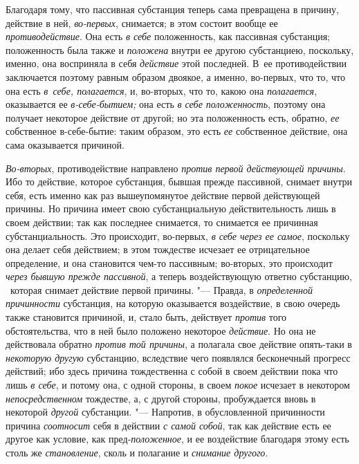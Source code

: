 Благодаря тому, что пассивная субстанция теперь сама превращена в причину,
действие в ней, {\em во-первых}, снимается; в этом
состоит вообще ее {\em противодействие}. Она есть
{\em в себе} положенность, как пассивная субстанция;
положенность была также и {\em положена} внутри ее
другою субстанциею, поскольку, именно, она восприняла в себя
{\em действие} этой последней. В~ее противодействии
заключается поэтому равным образом двоякое, а именно, во-первых, что то,
что она есть {\em в~себе, полагается}, и, во-вторых, что то, какою она
{\em полагается}, оказывается ее {\em в-себе-бытием;} она есть
{\em в себе положенность}, поэтому она получает
некоторое действие от другой; но эта положенность есть, обратно,
{\em ее} собственное в-себе-бытие: таким образом, это
есть {\em ее} собственное действие, она сама оказывается причиной.

{\em Во-вторых}, противодействие направлено
{\em против первой действующей причины}. Ибо то
действие, которое субстанция, бывшая прежде пассивной, снимает внутри себя,
есть именно как раз вышеупомянутое действие первой действующей причины. Но
причина имеет свою субстанциальную действительность лишь в своем действии;
так как последнее снимается, то снимается ее причинная субстанциальность.
Это происходит, во-первых, {\em в себе через ее самое},
поскольку она делает себя действием; в этом тождестве исчезает ее
отрицательное определение, и она становится чем-то пассивным; во-вторых,
это происходит {\em через бывшую прежде пассивной}, а
теперь воздействующую ответно субстанцию, \ которая снимает действие первой
причины. "--- Правда, в {\em определенной причинности}
субстанция, на которую оказывается воздействие, в свою очередь также
становится причиной, и, стало быть, действует
{\em против} того обстоятельства, что в ней было
положено некоторое {\em действие}. Но она не
действовала обратно {\em против той причины}, а
полагала свое действие опять-таки в {\em некоторую
другую} субстанцию, вследствие чего появлялся бесконечный прогресс
действий; ибо здесь причина тождественна с собой в своем действии пока что
лишь {\em в себе}, и потому она, с одной стороны, в
своем {\em покое} исчезает в некотором
{\em непосредственном} тождестве, а, с другой стороны,
пробуждается вновь в некоторой {\em другой} субстанции.
"--- Напротив, в обусловленной причинности причина
{\em соотносит} себя в действии
{\em с самой собой}, так как действие есть ее другое
как условие, как пред-{\em положенное}, и ее
воздействие благодаря этому есть столь же
{\em становление}, сколь и полагание и {\em снимание другого}.

